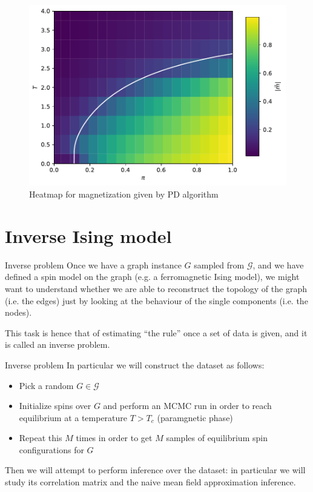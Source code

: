 \documentclass[handout]{beamer}
\begin{document}
\begin{frame}[plain]
    \begin{figure}
        \centering
        \includegraphics[width=.8\textwidth]{pd_heatmap}
        \caption{Heatmap for magnetization given by PD algorithm}
        \label{fig:pd_heatmap}
    \end{figure}
\end{frame}

\section{Inverse Ising model}

\begin{frame}{Inverse problem}
    Once we have a graph instance $G$ sampled from $\mathcal{G}$, and we have
    defined a spin model on the graph (e.g. a ferromagnetic Ising model), we
    might want to understand whether we are able to \alert{reconstruct} the
    topology of the graph (i.e. the edges) just by looking at the behaviour of
    the single components (i.e. the nodes).
    
    This task is hence that of estimating ``the rule'' once a set of data is
    given, and it is called an \alert{inverse problem}.
\end{frame}

\begin{frame}{Inverse problem}
    In particular we will construct the dataset as follows:
    \begin{itemize}
        \item Pick a random $G \in \mathcal{G}$
        \item Initialize spins over $G$ and perform an MCMC run in order to
            reach equilibrium at a temperature $T > T_c$ (\alert{paramgnetic}
            phase)
        \item Repeat this $M$ times in order to get $M$ samples of equilibrium
            spin configurations for $G$
    \end{itemize}

    Then we will attempt to perform inference over the dataset: in particular we
    will study its \alert{correlation matrix} and the \alert{naive mean field
    approximation inference}.
\end{frame}
\end{document}
